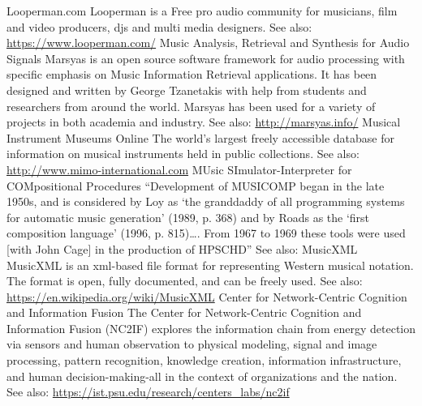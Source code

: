 	{Looperman.com}
	{Looperman is a Free pro audio community for musicians, film and video producers, djs and multi media designers. See also: \url{https://www.looperman.com/}}
	{Music Analysis, Retrieval and Synthesis for Audio Signals}
	{Marsyas is an open source software framework for audio processing with specific emphasis on Music Information Retrieval applications. It has been designed and written by George Tzanetakis with help from students and researchers from around the world. Marsyas has been used for a variety of projects in both academia and industry. See also: \url{http://marsyas.info/}}
	{Musical Instrument Museums Online}
	{The world's largest freely accessible database for information on musical instruments held in public collections. See also: \url{http://www.mimo-international.com}}
	{MUsic SImulator-Interpreter for COMpositional Procedures}
	{``Development of MUSICOMP began in the late 1950s, and is considered by Loy as `the granddaddy of all programming systems for automatic music generation' (1989, p. 368) and by Roads as the `first composition language' (1996, p. 815)\dots. From 1967 to 1969 these tools were used [with John Cage] in the production of HPSCHD'' See also: \url{} \parencite[44]{Ari05:Ano}}
	{MusicXML}
	{MusicXML is an \gls{xml}-based file format for representing Western musical notation. The format is open, fully documented, and can be freely used. See also: \url{https://en.wikipedia.org/wiki/MusicXML}}
	{Center for Network-Centric Cognition and Information Fusion}
	{ The Center for Network-Centric Cognition and Information Fusion (NC2IF) explores the information chain from energy detection via sensors and human observation to physical modeling, signal and image processing, pattern recognition, knowledge creation, information infrastructure, and human decision-making-all in the context of organizations and the nation. See also: \url{https://ist.psu.edu/research/centers_labs/nc2if}}
